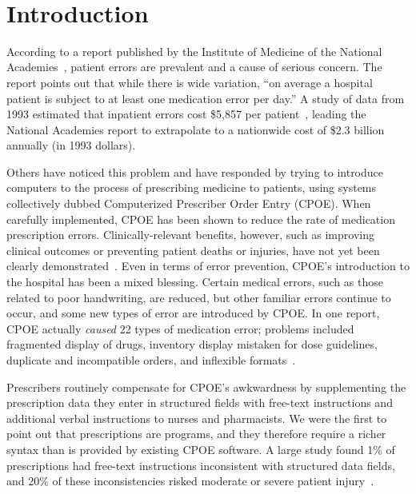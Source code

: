 \documentclass[11pt]{article}
\begin{document}
\newpage

\setlength{\parindent}{0pt}
\setlength{\parskip}{1ex plus 0.5ex minus 0.2ex}

\setcounter{page}{1}
\pagestyle{plain}


~

\section{Introduction}

According to a report published by the Institute of Medicine of the
National Academies~\citep{preventing-medical-errors}, patient errors
are prevalent and a cause of serious concern.
%
The report points out that while there is wide variation, ``on average
a hospital patient is subject to at least one medication error per
day.''
%
A study of data from 1993 estimated that inpatient errors cost \$5,857
per patient~\citep{bates-et-al-1997}, leading the National Academies
report to extrapolate to a nationwide cost of \$2.3 billion annually
(in 1993 dollars).

Others have noticed this problem and have responded by trying to
introduce computers to the process of prescribing medicine to
patients, using systems collectively dubbed Computerized Prescriber
Order Entry (CPOE).
%
When carefully implemented, CPOE has been shown to reduce the rate of
medication prescription errors.
%
Clinically-relevant benefits, however, such
as improving clinical outcomes or preventing patient deaths or
injuries, have not yet been clearly demonstrated~\citep{vanRosse2009}.
%
Even in terms of error prevention, CPOE's introduction to the hospital
has been a mixed blessing.
%
Certain medical errors, such as those related to poor handwriting, are
reduced, but other familiar errors continue to occur, and some new types
of error are introduced by CPOE.
%
In one report, CPOE actually \emph{caused} 22 types of medication
error; problems included fragmented display of drugs, inventory
display mistaken for dose guidelines, duplicate and incompatible
orders, and inflexible formats~\citep{Koppel2005}.

Prescribers routinely compensate for CPOE's awkwardness by
supplementing the prescription data they enter in structured fields
with free-text instructions and additional verbal instructions to
nurses and pharmacists.
%
We were the first to point out that
prescriptions are programs, and they therefore require a richer syntax than is
provided by existing CPOE software.
%
A large study found 1\% of prescriptions had free-text instructions
inconsistent with structured data fields, and 20\% of these
inconsistencies risked moderate or severe patient
injury~\citep{Singh2009}.
\end{document}
